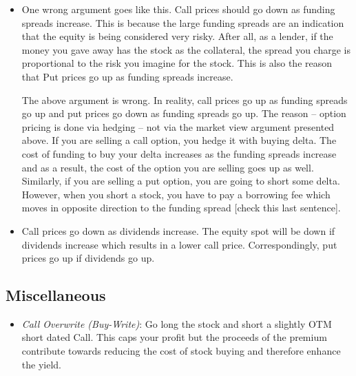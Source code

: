 \documentclass{amsart}
\theoremstyle{plain}
\numberwithin{equation}{section}
\begin{document}
\begin{itemize}
	\item One wrong argument goes like this. Call prices should go down as funding spreads 
	increase. This is because the	large funding spreads are an indication that the equity is being considered very risky. After all, as a lender, if the money you gave away has the stock as the collateral, the spread you charge is proportional to the risk you imagine for the stock. 
This is also the reason that Put prices go up as funding spreads increase.

The above argument is wrong. In reality, call prices go up as funding spreads go up and put prices go down as funding spreads go up. The reason -- option pricing is done via hedging -- not via the 
market view argument presented above. If you are selling a call option, you hedge it with 
buying delta. The cost of funding to buy your delta increases as the funding spreads increase and 
as a result, the cost of the option you are selling goes up as well. Similarly, if you are selling
a put option, you are going to short some delta. However, when you short a stock, you have to 
pay a borrowing fee which moves in opposite direction to the funding spread 
[check this last sentence]. 

	
	\item Call prices go down as dividends increase. The equity spot will be down if 
	dividends increase which results in a lower call price. Correspondingly, put prices
	go up if dividends go up. 
\end{itemize}

\subsection{Miscellaneous}
\begin{itemize}
	\item \emph{Call Overwrite (Buy-Write)}: Go long the stock and 
	short a slightly OTM short dated Call. This caps your profit but the 
	proceeds of the premium contribute towards reducing the cost of
	stock buying and therefore enhance the yield. 
\end{itemize}
	
\end{document}
